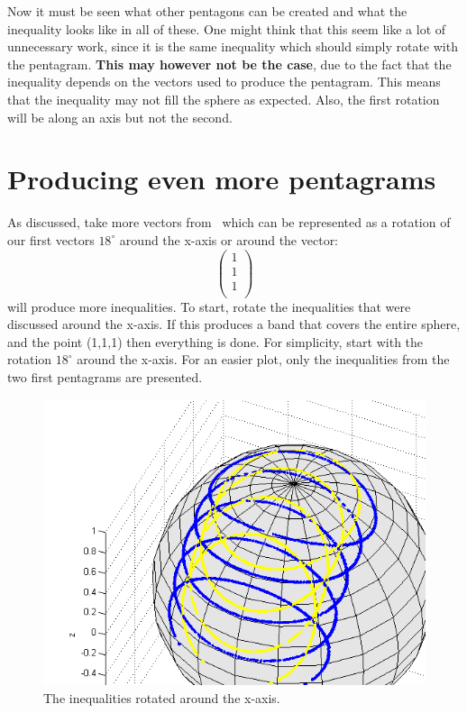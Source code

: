 Now it must be seen what other pentagons can be created and what the inequality looks like in all of these.
One might think that this seem like a lot of unnecessary work, since it is the same inequality which should simply rotate with the pentagram. \textbf{This may however not be the case}, due to the fact that the inequality depends on the vectors used to produce the pentagram. This means that the inequality may not fill the sphere as expected. Also, the first rotation will be along an axis but not the second.
\newpage
\section{Producing even more pentagrams}
As discussed, take more vectors from~\cite{Kochen1968The} which can be represented as a rotation of our first vectors $18^\circ$ around the x-axis or around the vector: 
\begin{equation*}
\begin{pmatrix}
1\\
1\\
1\\
\end{pmatrix}
\end{equation*}
will produce more inequalities.
To start, rotate the inequalities that were discussed around the x-axis. If this produces a band that covers the entire sphere, and the point (1,1,1) then everything is done.
For simplicity, start with the rotation $18^\circ$ around the x-axis. For an easier plot, only the inequalities from the two first pentagrams are presented.
\begin{figure}[H]
\begin{center}
\includegraphics[scale=0.5]{ine12all.png}
\caption{The inequalities rotated around the x-axis.}
\label{fig:ine12all}
\end{center}
\end{figure}
